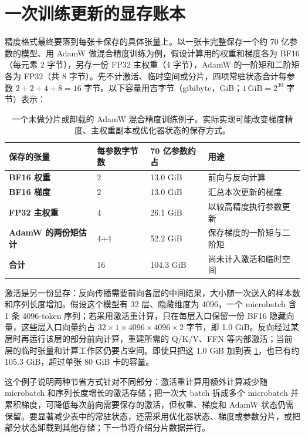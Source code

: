 \section{一次训练更新的显存账本}

精度格式最终要落到每张卡保存的具体张量上。以一张卡完整保存一个约 70 亿参数的模型、用 AdamW 做混合精度训练为例，假设计算用的权重和梯度各为 BF16（每元素 2 字节），另存一份 FP32 主权重（4 字节），AdamW 的一阶矩和二阶矩各为 FP32（共 8 字节）。先不计激活、临时空间或分片，四项常驻状态合计每参数 \(2+2+4+8=16\) 字节。以下容量用吉字节（gibibyte，GiB；\(1\,\mathrm{GiB}=2^{30}\) 字节）表示：

\begin{table}[H]
\centering\small
\begin{tabularx}{\textwidth}{>{\bfseries}p{37mm} p{30mm} p{26mm} X}
\toprule
保存的张量 & 每参数字节数 & 70 亿参数约占 & 用途\\
\midrule
BF16 权重 & 2 & 13.0 GiB & 前向与反向计算\\
BF16 梯度 & 2 & 13.0 GiB & 汇总本次更新的梯度\\
FP32 主权重 & 4 & 26.1 GiB & 以较高精度执行参数更新\\
AdamW 的两份矩估计 & 4+4 & 52.2 GiB & 保存梯度的一阶矩与二阶矩\\
\midrule
合计 & 16 & 104.3 GiB & 尚未计入激活和临时空间\\
\bottomrule
\end{tabularx}
\caption{一个未做分片或卸载的 AdamW 混合精度训练例子。实际实现可能改变梯度精度、主权重副本或优化器状态的保存方式。}
\label{tab:training-memory-budget}
\end{table}

激活是另一份显存：反向传播需要前向各层的中间结果，大小随一次送入的样本数和序列长度增加。假设这个模型有 32 层、隐藏维度为 4096，一个 microbatch 含 1 条 4096-token 序列；若采用激活重计算，只在每层入口保留一份 BF16 隐藏向量，这些层入口向量约占 \(32\times1\times4096\times4096\times2\) 字节，即 1.0 GiB。反向经过某层时再运行该层的部分前向计算，重建所需的 Q/K/V、FFN 等内部激活；当前层的临时张量和计算工作区仍要占空间。即使只把这 1.0 GiB 加到表 \ref{tab:training-memory-budget}，也已有约 105.3 GiB，超过单张 80 GiB 卡的容量。

这个例子说明两种节省方式针对不同部分：激活重计算用额外计算减少随 microbatch 和序列长度增长的激活存储；把一次大 batch 拆成多个 microbatch 并累积梯度，可降低每次前向需要保存的激活，但权重、梯度和 AdamW 状态仍需保留。要显著减少表中的常驻状态，还需采用优化器状态、梯度或参数分片，或把部分状态卸载到其他存储；下一节将介绍分片数据并行。

